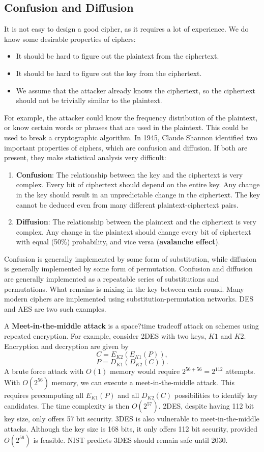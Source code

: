 \documentclass[11pt]{article}
\theoremstyle{plain} %
\theoremstyle{definition}
\theoremstyle{example}
\theoremstyle{remark}
\begin{document}
\subsection{Confusion and Diffusion}
It is not easy to design a good cipher, as it requires a lot of experience. We do know some desirable properties of ciphers:
\begin{itemize}
	\item It should be hard to figure out the plaintext from the ciphertext.
	\item It should be hard to figure out the key from the ciphertext.
	\item We assume that the attacker already knows the ciphertext, so the ciphertext should not be trivially similar to the plaintext.
\end{itemize}
For example, the attacker could know the frequency distribution of the plaintext, or know certain words or phrases that are used in the plaintext. This could be used to break a cryptographic algorithm. In 1945, Claude Shannon identified two important properties of ciphers, which are confusion and diffusion. If both are present, they make statistical analysis very difficult:
\begin{enumerate}
	\item \textbf{Confusion}: The relationship between the key and the ciphertext is very complex. Every bit of ciphertext should depend on the entire key. Any change in the key should result in an unpredictable change in the ciphertext. The key cannot be deduced even from many different plaintext-ciphertext pairs.
	\item \textbf{Diffusion}: The relationship between the plaintext and the ciphertext is very complex. Any change in the plaintext should change every bit of ciphertext with equal (50\%) probability, and vice versa (\textbf{avalanche effect}).
\end{enumerate}

Confusion is generally implemented by some form of substitution, while diffusion is generally implemented by some form of permutation. Confusion and diffusion are generally implemented as a repeatable series of substitutions and permutations. What remains is mixing in the key between each round. Many modern ciphers are implemented using substitution-permutation networks. DES and AES are two such examples.

A \textbf{Meet-in-the-middle attack} is a space?time tradeoff attack on schemes using repeated encryption. For example, consider 2DES with two keys, $K1$ and $K2$. Encryption and decryption are given by
$$C = E_{K2}( E_{K1} ( P ) ),$$
$$P = D_{K1}( D_{K2} ( C ) ).$$
A brute force attack with $O(1)$ memory would require $2^{56 + 56} = 2^{112}$ attempts. With $O(2^{56})$ memory, we can execute a meet-in-the-middle attack. This requires precomputing all $E_{K1}(P)$ and all $D_{K2}(C)$ possibilities to identify key candidates. The time complexity is then $O(2^{57})$.
2DES, despite having 112 bit key size, only offers 57 bit security. 3DES is also vulnerable to meet-in-the-middle attacks. Although the key size is 168 bits, it only offers 112 bit security, provided $O(2^{56})$ is feasible. NIST predicts 3DES should remain safe until 2030.
\end{document}
